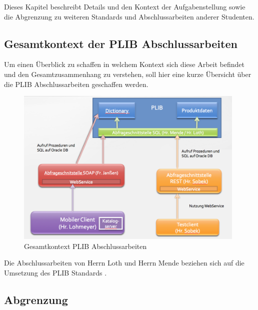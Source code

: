 Dieses Kapitel beschreibt Details und den Kontext der Aufgabenstellung sowie die Abgrenzung zu weiteren Standards und Abschlussarbeiten anderer Studenten. 

\subsection{Gesamtkontext der PLIB Abschlussarbeiten}

Um einen Überblick zu schaffen in welchem Kontext sich diese Arbeit befindet und den Gesamtzusammenhang zu verstehen, soll hier eine kurze Übersicht über die PLIB Abschlussarbeiten geschaffen werden. 

\begin{figure}[htbp]
	\centering
		\includegraphics[width=0.98\textwidth]{images/gesamtkontext_plib.png}
	\caption{Gesamtkontext PLIB Abschlussarbeiten}
	\label{fig:gesamtkontext_plib}
\end{figure}

Die Abschlussarbeiten von Herrn Loth und Herrn Mende beziehen sich auf die Umsetzung des PLIB Standards  \citep[Vergl.][]{iso13584-42}.

\subsection{Abgrenzung}

